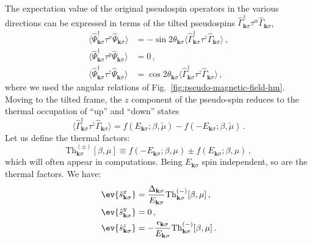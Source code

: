The expectation value of the original pseudospin operators in the various directions can be expressed in terms of the tilted pseudospins $\hat \Gamma_{\mathbf{k}\sigma}^\dagger \tau^\alpha \hat \Gamma_{\mathbf{k}\sigma}$,
\[
\begin{aligned}
	\langle \hat \Psi_{\mathbf{k}\sigma}^\dagger \tau^x \hat \Psi_{\mathbf{k}\sigma} \rangle &= -\sin 2\theta_{\mathbf{k}\sigma} \langle \hat \Gamma_{\mathbf{k}\sigma}^\dagger \tau^z \hat \Gamma_{\mathbf{k}\sigma} \rangle \, , \\
	\langle \hat \Psi_{\mathbf{k}\sigma}^\dagger \tau^y \hat \Psi_{\mathbf{k}\sigma} \rangle &= 0 \, , \\
	\langle \hat \Psi_{\mathbf{k}\sigma}^\dagger \tau^z \hat \Psi_{\mathbf{k}\sigma} \rangle &= \cos 2\theta_{\mathbf{k}\sigma} \langle \hat \Gamma_{\mathbf{k}\sigma}^\dagger \tau^z \hat \Gamma_{\mathbf{k}\sigma} \rangle \, ,
\end{aligned}
\]
where we used the angular relations of Fig.~\ref{fig:pseudo-magnetic-field-hm}. Moving to the tilted frame, the $z$ component of the pseudo-spin reduces to the thermal occupation of ``up'' and ``down'' states
\begin{equation}\label{eq:af-<z>}
	\langle \hat \Gamma_{\mathbf{k}\sigma}^\dagger \tau^z \hat \Gamma_{\mathbf{k}\sigma} \rangle =
	f\left(
	E_{\mathbf{k}\sigma};\beta,\tilde{\mu}
	\right) - f\left(
	-E_{\mathbf{k}\sigma};\beta,\tilde{\mu}
	\right) \, .
\end{equation}
Let us define the thermal factors:
\begin{equation}\label{eq:af-Th}
	\mathrm{Th}_{\mathbf{k}\sigma}^{(\pm)}[\beta,\mu] \equiv 
	f\left(
	-E_{\mathbf{k}\sigma};\beta,\mu
	\right) \pm f\left(
	E_{\mathbf{k}\sigma};\beta,\mu
	\right) \, ,
\end{equation}
which will often appear in computations. Being $E_{\mathbf{k}\sigma}$ spin independent, so are the thermal factors. We have:
\begin{align}
	\ev{\hat s_{\mathbf{k}\sigma}^x} &= \frac{\Delta_{\mathbf{k}\sigma}}{E_{\mathbf{k}\sigma}} \mathrm{Th}_{\mathbf{k}\sigma}^{(-)}[\beta,\mu] \, , \label{eq:af-hm-sx}\\
	\ev{\hat s_{\mathbf{k}\sigma}^y} &= 0  \, , \label{eq:af-hm-sy} \\
	\ev{\hat s_{\mathbf{k}\sigma}^z} &=  -\frac{\epsilon_{\mathbf{k}\sigma}}{E_{\mathbf{k}\sigma}}  \mathrm{Th}_{\mathbf{k}\sigma}^{(-)}[\beta,\mu] \, . \label{eq:af-hm-sz}
\end{align}

